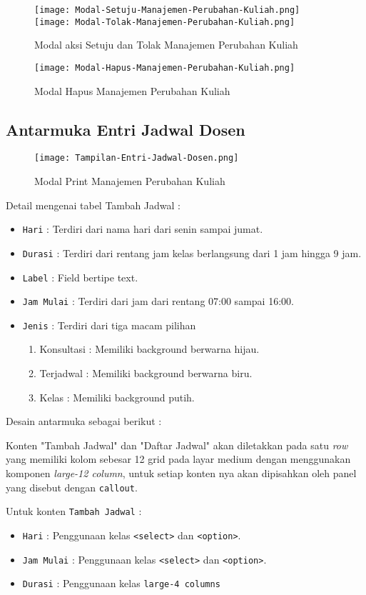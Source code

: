\begin{figure} [H]
	\centering  
	\texttt{[image: Modal-Setuju-Manajemen-Perubahan-Kuliah.png]}
	\texttt{[image: Modal-Tolak-Manajemen-Perubahan-Kuliah.png]}    
	\caption{Modal aksi Setuju dan Tolak Manajemen Perubahan Kuliah} 
\end{figure}


\begin{figure} [H]
	\centering  
	\texttt{[image: Modal-Hapus-Manajemen-Perubahan-Kuliah.png]}  
	\caption{Modal Hapus Manajemen Perubahan Kuliah} 
\end{figure}

\subsection{Antarmuka Entri Jadwal Dosen}
\begin{figure} [H]
	\centering  
	\texttt{[image: Tampilan-Entri-Jadwal-Dosen.png]}  
	\caption{Modal Print Manajemen Perubahan Kuliah} 
\end{figure}

Detail mengenai tabel Tambah Jadwal :
\begin{itemize}
	\item \texttt{Hari} : Terdiri dari nama hari dari senin sampai jumat.
	\item \texttt{Durasi} : Terdiri dari rentang jam kelas berlangsung dari 1 jam hingga 9 jam.
	\item \texttt{Label} : Field bertipe text.
	\item \texttt{Jam Mulai} : Terdiri dari jam dari rentang 07:00 sampai 16:00.
	\item \texttt{Jenis} : Terdiri dari tiga macam pilihan 
	\begin{enumerate}
		\item Konsultasi : Memiliki background berwarna hijau.
		\item Terjadwal : Memiliki background berwarna biru.
		\item Kelas : Memiliki background putih.
	\end{enumerate}
\end{itemize}

Desain antarmuka sebagai berikut : \par
Konten "Tambah Jadwal" dan "Daftar Jadwal" akan diletakkan pada satu \textit{row} yang memiliki kolom sebesar 12 grid pada layar medium dengan menggunakan komponen \textit{large-12 column}, untuk setiap konten nya akan dipisahkan oleh panel yang disebut dengan \texttt{callout}. \par
Untuk konten \texttt{Tambah Jadwal} :
\begin{itemize}
	\item \texttt{Hari} : Penggunaan kelas \texttt{<select>} dan \texttt{<option>}.
	\item \texttt{Jam Mulai} : Penggunaan kelas \texttt{<select>} dan \texttt{<option>}.
	\item \texttt{Durasi} : Penggunaan kelas \texttt{large-4 columns}
\end{itemize}


